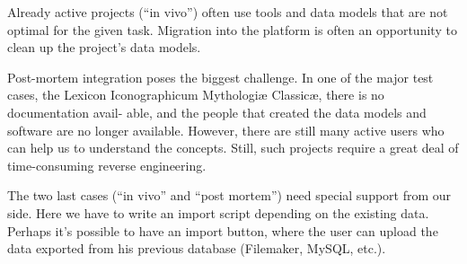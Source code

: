 Already active projects (``in vivo'') often use tools and data models that are not optimal for the given task. Migration into the platform is often an opportunity to clean up the project's data models.

Post-mortem integration poses the biggest challenge. In one of the major test cases, the Lexicon Iconographicum Mythologiæ Classicæ, there is no documentation avail- able, and the people that created the data models and software are no longer available. However, there are still many active users who can help us to understand the concepts. Still, such projects require a great deal of time-consuming reverse engineering.

The two last cases (``in vivo'' and ``post mortem'') need special support from our side. Here we have to write an import script depending on the existing data. Perhaps it's possible to have an import button, where the user can upload the data exported from his previous database (Filemaker, MySQL, etc.).


